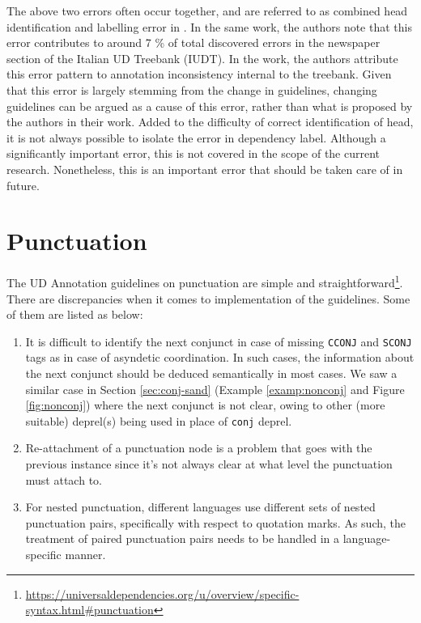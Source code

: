 The above two errors often occur together, and are referred to as combined head identification and labelling error in \cite{alzetta2017dangerous}. In the same work, the authors note that this error contributes to around 7 \% of total discovered errors in the newspaper section of the Italian UD Treebank (IUDT). In the work, the authors attribute this error pattern to annotation inconsistency internal to the treebank. Given that this error is largely stemming from the change in guidelines, changing guidelines can be argued as a cause of this error, rather than what is proposed by the authors in their work. Added to the difficulty of correct identification of head, it is not always possible to isolate the error in dependency label. Although a significantly important error, this is not covered in the scope of the current research. Nonetheless, this is an important error that should be taken care of in future.

\section{Punctuation}

The UD Annotation guidelines on punctuation are simple and straightforward\footnote{\url{https://universaldependencies.org/u/overview/specific-syntax.html\#punctuation}}. There are discrepancies when it comes to implementation of the guidelines. Some of them are listed as below:

\begin{enumerate}
    \item It is difficult to identify the next conjunct in case of missing \verb|CCONJ| and \verb|SCONJ| tags as in case of asyndetic coordination. In such cases, the information about the next conjunct should be deduced semantically in most cases. We saw a similar case in Section \ref{sec:conj-sand} (Example \ref{examp:nonconj} and Figure \ref{fig:nonconj}) where the next conjunct is not clear, owing to other (more suitable) deprel(s) being used in place of \verb|conj| deprel.
    \item Re-attachment of a punctuation node is a problem that goes with the previous instance since it's not always clear at what level the punctuation must attach to.
    \item For nested punctuation, different languages use different sets of nested punctuation pairs, specifically with respect to quotation marks. As such, the treatment of paired punctuation pairs needs to be handled in a language-specific manner.
\end{enumerate}

